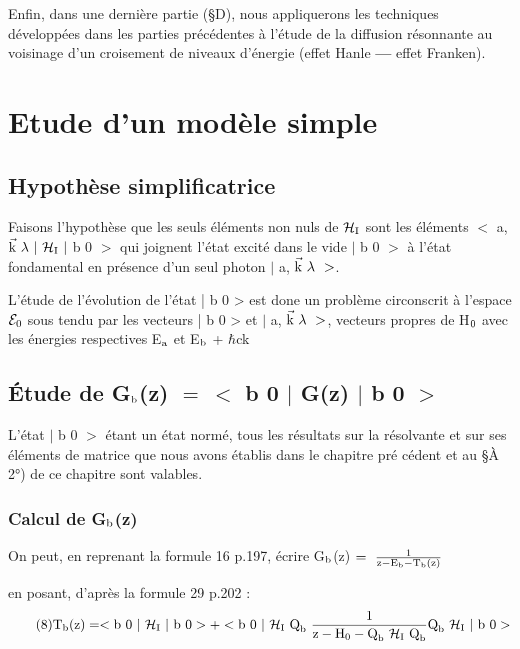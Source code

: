 Enfin, dans une dernière partie (\S D), nous appliquerons les
techniques développées dans les parties précédentes à l'étude de la diffusion
résonnante au voisinage d'un croisement de niveaux d'énergie (effet Hanle {\bf —}
effet Franken).

\section{Etude d'un modèle simple}%

\subsection{Hypothèse simplificatrice}%

Faisons l'hypothèse que les seuls éléments non nuls de $\mathcal{H}_{\text{I}}$ sont
les éléments $<$ a, $\vec{\mt{k}}\ \lambda\ |\ \mc{H}_\mt{I}\ |$ b 0 $>$ qui joignent l'état excité dans le vide
$|$ b 0 $>$ à l'état fondamental en présence d'un seul photon $|$ a, $\vec{\text{k}}\ \lambda\ >$.

L'étude de l'évolution de l'état | b 0 > est done un problème circonscrit à l'espace $\mathcal{E}_{\text{0}}$ sous tendu par les vecteurs | b 0 > et $|$ a, $\vec{\text{k}}\ \lambda\ >$, vecteurs propres de H$_{\text{0}}$ avec les énergies respectives E$_{\text{a}}$ et E$_{\text{b}}$ + $\hbar$ck

\subsection{Étude de G$_{\text{b}}$(z) $=\ <$ b 0 $|$ G(z) $|$ b 0 $>$}%

L'état $|$ b 0 $>$ étant un état normé, tous les résultats sur la résolvante et sur ses éléments de matrice que nous avons établis dans le chapitre pré
cédent et au \S À 2°) de ce chapitre sont valables.

\subsubsection{Calcul de G$_{\text{b}}$(z)}%

On peut, en reprenant la formule 16 p.197, écrire G$_{\text{b}}$(z) $=\ \frac{1}{\mt{z}-\mt{E}_\mt{b}-\mt{T}_\mt{b}\mt{(z)}}$

en posant, d'après la formule 29 p.202 :
\[
\tag{8} \mt{T}_\mt{b}\mt{(z)} = < \mt{b 0 } |\ \mc{H}_\mt{I}\ |\mt{ b 0}> +
< \mt{b 0 } |\ \mc{H}_\mt{I}\ \mt{Q}_\mt{b}\ 
\frac{1}{\mt{z}-\mt{H}_0-\mt{Q}_\mt{b}\ \mc{H}_\mt{I}\ \mt{Q}_\mt{b}}
\mt{Q}_\mt{b}\ \mc{H}_\mt{I}\ |\mt{ b 0}>
\]

